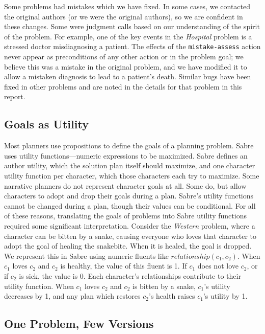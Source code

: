 \documentclass{nilreport}
\begin{document}
Some problems had mistakes which we have fixed. In some cases, we
contacted the original authors (or we were the original authors),
so we are confident in these changes. Some were judgment calls based
on our understanding of the spirit of the problem. For example, one
of the key events in the \emph{Hospital} problem is a stressed doctor
misdiagnosing a patient. The effects of the \texttt{mistake-assess}
action never appear as preconditions of any other action or in the
problem goal; we believe this was a mistake in the original problem,
and we have modified it to allow a mistaken diagnosis to lead to a
patient's death. Similar bugs have been fixed in other problems and
are noted in the details for that problem in this report.

\subsection{Goals as Utility}

Most planners use propositions to define the goals of a planning problem.
Sabre uses utility functions---numeric expressions to be maximized.
Sabre defines an author utility, which the solution plan itself should
maximize, and one character utility function per character, which
those characters each try to maximize. Some narrative planners do
not represent character goals at all. Some do, but allow characters
to adopt and drop their goals during a plan. Sabre's utility functions
cannot be changed during a plan, though their values can be conditional.
For all of these reasons, translating the goals of problems into Sabre
utility functions required some significant interpretation. Consider
the \emph{Western} problem, where a character can be bitten by a snake,
causing everyone who loves that character to adopt the goal of healing
the snakebite. When it is healed, the goal is dropped. We represent
this in Sabre using numeric fluents like $relationship(c_{1},c_{2})$.
When $c_{1}$ loves $c_{2}$ and $c_{2}$ is healthy, the value of
this fluent is 1. If $c_{1}$ does not love $c_{2}$, or if $c_{2}$
is sick, the value is 0. Each character's relationships contribute
to their utility function. When $c_{1}$ loves $c_{2}$ and $c_{2}$
is bitten by a snake, $c_{1}$'s utility decreases by 1, and any plan
which restores $c_{2}$'s health raises $c_{1}$'s utility by 1.

\subsection{One Problem, Few Versions}
\end{document}
